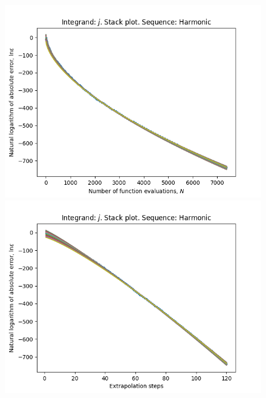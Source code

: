\begin{figure}[H]
\centering
\begin{minipage}{0.45\textwidth}
\centering
\includegraphics[scale=0.45]{../results/romberg_plots/gaussian_hp_harmonic_stack.png}
\end{minipage}
\begin{minipage}{0.45\textwidth}
\centering
\includegraphics[scale=0.45]{../results/romberg_plots/gaussian_hp_harmonic_steps_stack.png}
\end{minipage}
\end{figure}

